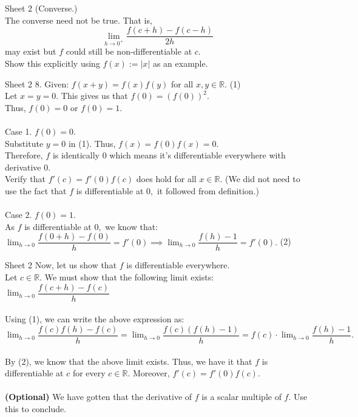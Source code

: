 \documentclass[handout, aspectratio=169]{beamer}
\begin{document}
\begin{frame}{Sheet 2}
	(Converse.)\\
	The converse need not be true. That is,
	\[\lim_{h\to 0^+}\dfrac{f(c + h) - f(c - h)}{2h}\]
	may exist but $f$ could still be non-differentiable at $c.$\\
	Show this explicitly using $f(x) := |x|$ as an example.
\end{frame}
\begin{frame}{Sheet 2}
	8. Given: $f(x + y) = f(x)f(y)$ for all $x, y \in \mathbb{R}.$ \hfill (1)\\
	Let $x = y = 0.$ This gives us that $f(0) = \left(f(0)\right)^2.$\\
	Thus, $f(0) = 0$ or $f(0) = 1.$\\~\\
	Case 1. $f(0) = 0.$\\
	Substitute $y = 0$ in (1). Thus, $f(x) = f(0)f(x) = 0.$\\
	Therefore, $f$ is identically $0$ which means it's differentiable everywhere with derivative $0.$ \\
	Verify that $f'(c) = f'(0)f(c)$ does hold for all $x \in \mathbb{R}.$ (We did not need to use the fact that $f$ is differentiable at $0,$ it followed from definition.)\\~\\
	Case 2. $f(0) = 1.$\\
	As $f$ is differentiable at $0,$ we know that:\\
	$\displaystyle\lim_{h\to 0}\dfrac{f(0+h) - f(0)}{h} = f'(0) \implies \displaystyle\lim_{h\to 0}\dfrac{f(h) - 1}{h} = f'(0).$ \hfill (2)\\
\end{frame}
\begin{frame}{Sheet 2}
	Now, let us show that $f$ is differentiable everywhere.\\
	Let $c \in \mathbb{R}.$ We must show that the following limit exists:\\
	$\displaystyle\lim_{h\to 0}\dfrac{f(c + h) - f(c)}{h}$\\~\\
	Using (1), we can write the above expression as:\\
	$\displaystyle\lim_{h\to 0}\dfrac{f(c)f(h) - f(c)}{h} = \lim_{h\to 0}\dfrac{f(c)(f(h) - 1)}{h} = f(c)\cdot\lim_{h\to 0}\dfrac{f(h) - 1}{h}.$\\~\\
	By (2), we know that the above limit exists. Thus, we have it that $f$ is differentiable at $c$ for every $c \in \mathbb{R}.$ Moreover, $f'(c) = f'(0)f(c).$\\~\\
	\textbf{(Optional)} We have gotten that the derivative of $f$ is a scalar multiple of $f.$ Use this to conclude.	
\end{frame}
\end{document}
